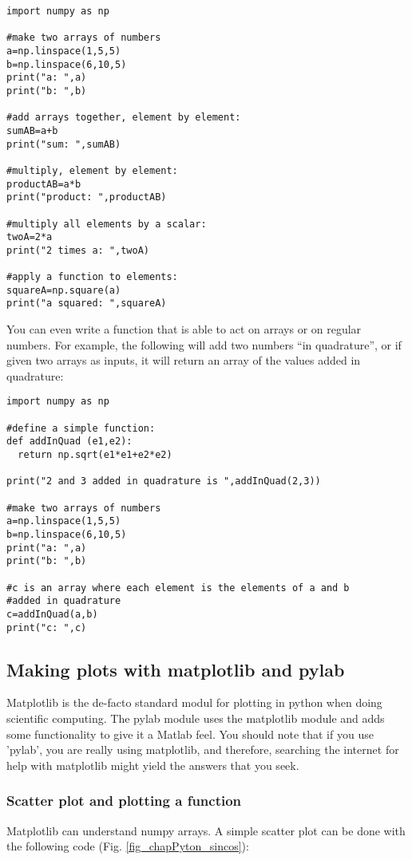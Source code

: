 \begin{lstlisting}[frame=single] 
import numpy as np

#make two arrays of numbers
a=np.linspace(1,5,5)
b=np.linspace(6,10,5)
print("a: ",a)
print("b: ",b)

#add arrays together, element by element:
sumAB=a+b
print("sum: ",sumAB)

#multiply, element by element:
productAB=a*b
print("product: ",productAB)

#multiply all elements by a scalar:
twoA=2*a
print("2 times a: ",twoA)

#apply a function to elements:
squareA=np.square(a)
print("a squared: ",squareA)

\end{lstlisting} 

You can even write a function that is able to act on arrays or on regular numbers. For example, the following will add two numbers ``in quadrature'', or if given two arrays as inputs, it will return an array of the values added in quadrature:
\begin{lstlisting}[frame=single] 
import numpy as np

#define a simple function:
def addInQuad (e1,e2):
  return np.sqrt(e1*e1+e2*e2)

print("2 and 3 added in quadrature is ",addInQuad(2,3))

#make two arrays of numbers
a=np.linspace(1,5,5)
b=np.linspace(6,10,5)
print("a: ",a)
print("b: ",b)

#c is an array where each element is the elements of a and b 
#added in quadrature
c=addInQuad(a,b)
print("c: ",c)

\end{lstlisting} 
\subsection{Making plots with matplotlib and pylab}
Matplotlib is the de-facto standard modul for plotting in python when doing scientific computing. The pylab module uses the matplotlib module and adds some functionality to give it a Matlab feel. You should note that if you use 'pylab', you are really using matplotlib, and therefore, searching the internet for help with matplotlib might yield the answers that you seek. 
\subsubsection{Scatter plot and plotting a function}
Matplotlib can understand numpy arrays. A simple scatter plot can be done with the following code (Fig. \ref{fig_chapPyton_sincos}):


